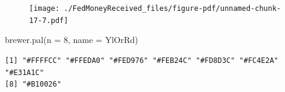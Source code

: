 \documentclass[
  letterpaper,
  DIV=11,
  numbers=noendperiod]{scrreport}
\newenvironment{Shaded}{\begin{snugshade}}{\end{snugshade}}
\newcommand{\AttributeTok}[1]{\textcolor[rgb]{0.40,0.45,0.13}{#1}}
\newcommand{\DecValTok}[1]{\textcolor[rgb]{0.68,0.00,0.00}{#1}}
\newcommand{\FunctionTok}[1]{\textcolor[rgb]{0.28,0.35,0.67}{#1}}
\newcommand{\NormalTok}[1]{\textcolor[rgb]{0.00,0.23,0.31}{#1}}
\newcommand{\StringTok}[1]{\textcolor[rgb]{0.13,0.47,0.30}{#1}}
\begin{document}
\begin{figure}[H]

{\centering \texttt{[image: ./FedMoneyReceived\_files/figure-pdf/unnamed-chunk-17-7.pdf]}

}

\end{figure}

\begin{Shaded}
\begin{Highlighting}[]
\FunctionTok{brewer.pal}\NormalTok{(}\AttributeTok{n =} \DecValTok{8}\NormalTok{, }\AttributeTok{name =} \StringTok{\textquotesingle{}YlOrRd\textquotesingle{}}\NormalTok{)}
\end{Highlighting}
\end{Shaded}

\begin{verbatim}
[1] "#FFFFCC" "#FFEDA0" "#FED976" "#FEB24C" "#FD8D3C" "#FC4E2A" "#E31A1C"
[8] "#B10026"
\end{verbatim}
\end{document}
